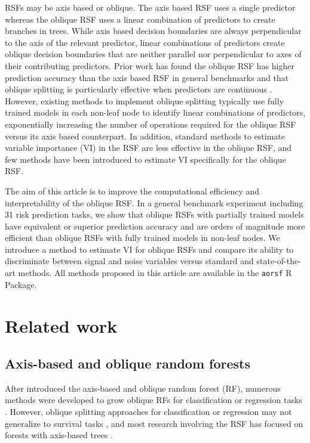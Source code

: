 \documentclass[twoside,11pt]{article}\usepackage[]{graphicx}\usepackage[]{xcolor}
\newcommand{\eg}{for example}
\begin{document}
RSFs may be axis based or oblique. The axis based RSF uses a single predictor whereas the oblique RSF uses a linear combination of predictors to create branches in trees. While axis based decision boundaries are always perpendicular to the axis of the relevant predictor, linear combinations of predictors create oblique decision boundaries that are neither parallel nor perpendicular to axes of their contributing predictors. Prior work has found the oblique RSF has higher prediction accuracy than the axis based RSF in general benchmarks \citep{jaeger2019oblique} and that oblique splitting is particularly effective when predictors are continuous \citep{menze2011oblique}. However, existing methods to implement oblique splitting typically use fully trained models in each non-leaf node to identify linear combinations of predictors, exponentially increasing the number of operations required for the oblique RSF versus its axis based counterpart. In addition, standard methods to estimate variable importance (VI) in the RSF are less effective in the oblique RSF, and few methods have been introduced to estimate VI specifically for the oblique RSF.

The aim of this article is to improve the computational efficiency and interpretability of the oblique RSF. In a general benchmark experiment including 31 risk prediction tasks, we show that oblique RSFs with partially trained models have equivalent or superior prediction accuracy and are orders of magnitude more efficient than oblique RSFs with fully trained models in non-leaf nodes. We introduce a method to estimate VI for oblique RSFs and compare its ability to discriminate between signal and noise variables versus standard and state-of-the-art methods. All methods proposed in this article are available in the \texttt{aorsf} R Package.

\section{Related work}

\subsection{Axis-based and oblique random forests}

After \citet{breiman2001random} introduced the axis-based and oblique random forest (RF), numerous methods were developed to grow oblique RFs for classification or regression tasks \citep{menze2011oblique, zhang2014oblique, rainforth2015canonical, zhu2015reinforcement, poona2016investigating, qiu2017oblique, tomita2020sparse, katuwal2020heterogeneous}. However, oblique splitting approaches for classification or regression may not generalize to survival tasks \citep[\eg, see][Section~4.5.1]{zhu2013tree}, and most research involving the RSF has focused on forests with axis-based trees \citep{wang2017selective}.
\end{document}
